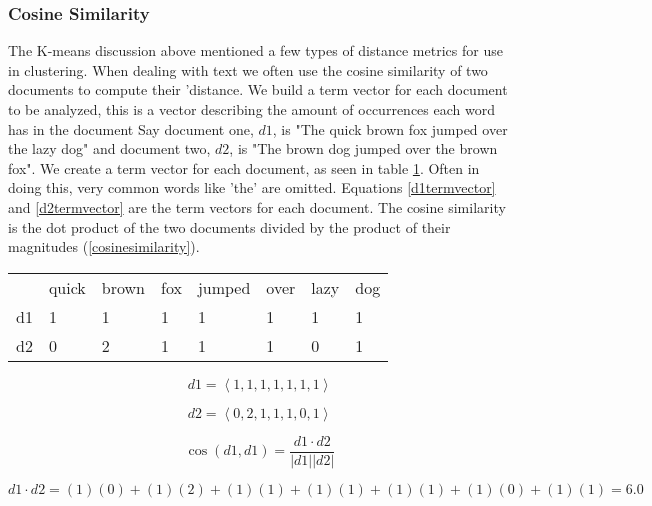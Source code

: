 \documentclass[12pt]{article}
\begin{document}
\begin{doublespacing}
\subsubsection{Cosine Similarity}
The K-means discussion above mentioned a few types of distance metrics for use in clustering.
When dealing with text we often use the cosine similarity of two documents to compute their 'distance.
We build a term vector for each document to be analyzed, this is a vector describing the amount of occurrences each word has in the document
Say document one, $d1$, is "The quick brown fox jumped over the lazy dog" and document two, $d2$, is "The brown dog jumped over the brown fox".
We create a term vector for each document, as seen in table \ref{termtable}. 
Often in doing this, very common words like 'the' are omitted.
Equations \ref{d1termvector} and \ref{d2termvector} are the term vectors for each document.
The cosine similarity is the dot product of the two documents divided by the product of their magnitudes (\ref{cosinesimilarity}). \citep{huang2008similarity}

\begin{table} \label{termtable}
    \begin{tabular}{llllllll}
    ~  & quick & brown & fox & jumped & over & lazy & dog \\
    d1 & 1     & 1     & 1   & 1      & 1    & 1    & 1   \\
    d2 & 0     & 2     & 1   & 1      & 1    & 0    & 1   \\
    \end{tabular}
\end{table}

\begin{equation} \label{d1termvector}
d1 = \left< 1, 1, 1, 1, 1, 1, 1 \right>
\end{equation}

\begin{equation} \label{d2termvector}
d2 = \left< 0, 2, 1, 1, 1, 0, 1 \right>
\end{equation}

\begin{equation} \label{cosinesimilarity}
\cos (d1,d1) = \frac{d1 \cdot d2 }{\left| d1 \right| \left| d2 \right|} 
\end{equation}

\begin{equation} \label{cosinesimilarity1}
 d1 \cdot d2 = (1)(0) + (1)(2) + (1)(1) + (1)(1) + (1)(1) + (1)(0) + (1)(1) = 6.0 
\end{equation}


\end{doublespacing}
\end{document}

